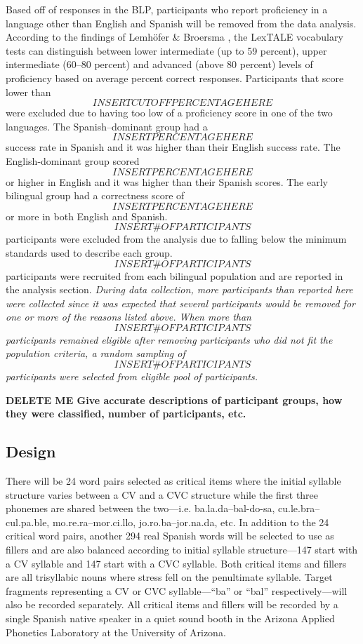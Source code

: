 Based off of responses in the BLP, participants who report proficiency in a language other than English and Spanish will be removed from the data analysis. According to the findings of Lemhöfer \& Broersma \parencite*{Lemhofer2012-hz}, the LexTALE vocabulary tests can distinguish between lower intermediate (up to 59 percent), upper intermediate (60–80 percent) and advanced (above 80 percent) levels of proficiency based on average percent correct responses. Participants that score lower than \[INSERT CUTOFF PERCENTAGE HERE\] were excluded due to having too low of a proficiency score in one of the two languages. The Spanish–dominant group had a  \[INSERT PERCENTAGE HERE\] success rate in Spanish and it was higher than their English success rate. The English-dominant group scored \[INSERT PERCENTAGE HERE\] or higher in English and it was higher than their Spanish scores. The early bilingual group had a correctness score of \[INSERT PERCENTAGE HERE\] or more in both English and Spanish. \[INSERT \# OF PARTICIPANTS\] participants were excluded from the analysis due to falling below the minimum standards used to describe each group. \[INSERT \# OF PARTICIPANTS\]  participants were recruited from each bilingual population and are reported in the analysis section. 
\emph{During data collection, more participants than reported here were collected since it was expected that several participants would be removed for one or more of the reasons listed above. When more than \[INSERT \# OF PARTICIPANTS\] participants remained eligible after removing participants who did not fit the population criteria, a random sampling of \[INSERT \# OF PARTICIPANTS\] participants were selected from eligible pool of participants.}

\textbf{DELETE ME Give accurate descriptions of participant groups, how they were classified, number of participants, etc.}


\subsection{Design}

There will be 24 word pairs selected as critical items where the initial syllable structure varies between a CV and a CVC structure while the first three phonemes are shared between the two—i.e. ba.la.da–bal-do-sa, cu.le.bra–cul.pa.ble, mo.re.ra–mor.ci.llo, jo.ro.ba–jor.na.da, etc. In addition to the 24 critical word pairs, another 294 real Spanish words will be selected to use as fillers and are also balanced according to initial syllable structure—147 start with a CV syllable and 147 start with a CVC syllable. Both critical items and fillers are all trisyllabic nouns where stress fell on the penultimate syllable. Target fragments representing a CV or CVC syllable—“ba” or “bal” respectively—will also be recorded separately. All critical items and fillers will be recorded by a single Spanish native speaker in a quiet sound booth in the Arizona Applied Phonetics Laboratory at the University of Arizona. 


